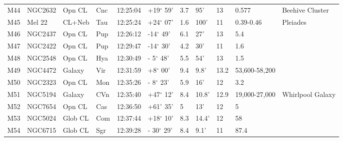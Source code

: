 \documentclass[10pt,twoside,a4paper,english]{article}
\begin{document}
\begin{longtable}{@{}lllllllllll@{}}
M44        & NGC2632     & Opn CL     & Cnc       & 12:25:04 & +19$^{\circ}$ 59'  & 3.7       & 95'                  & 13       & 0.577               & Beehive Cluster                           \\ 
M45        & Mel 22      & CL+Neb     & Tau       & 12:25:24 & +24$^{\circ}$ 07'  & 1.6       & 100'                 & 11       & 0.39-0.46           & Pleiades                                  \\ 
M46        & NGC2437     & Opn CL     & Pup       & 12:26:12 & -14$^{\circ}$ 49'  & 6.1       & 27'                  & 13       & 5.4                 &                                           \\ 
M47        & NGC2422     & Opn CL     & Pup       & 12:29:47 & -14$^{\circ}$ 30'  & 4.2       & 30'                  & 11       & 1.6                 &                                           \\ 
M48        & NGC2548     & Opn CL     & Hya       & 12:30:49 & - 5$^{\circ}$ 48'  & 5.5       & 54'                  & 13       & 1.5                 &                                           \\ 
M49        & NGC4472     & Galaxy     & Vir       & 12:31:59 & +8$^{\circ}$ 00'   & 9.4       & 9.8'                 & 13.2     & 53,600-58,200       &                                           \\ 
M50        & NGC2323     & Opn CL     & Mon       & 12:35:26 & - 8$^{\circ}$ 23'  & 5.9       & 16'                  & 12       & 3.2                 &                                           \\ 
M51        & NGC5194     & Galaxy     & CVn       & 12:35:40 & +47$^{\circ}$ 12'  & 8.4       & 10.8'                & 12.9     & 19,000-27,000       & Whirlpool Galaxy                          \\ 
M52        & NGC7654     & Opn CL     & Cas       & 12:36:50 & +61$^{\circ}$ 35'  & 5         & 13'                  & 12       & 5                   &                                           \\ 
M53        & NGC5024     & Glob CL    & Com       & 12:37:44 & +18$^{\circ}$ 10'  & 8.3       & 14.4'                & 12       & 58                  &                                           \\ 
M54        & NGC6715     & Glob CL    & Sgr       & 12:39:28 & - 30$^{\circ}$ 29' & 8.4       & 9.1'                 & 11       & 87.4                &                                           \\ 

\end{longtable}
\end{document}
